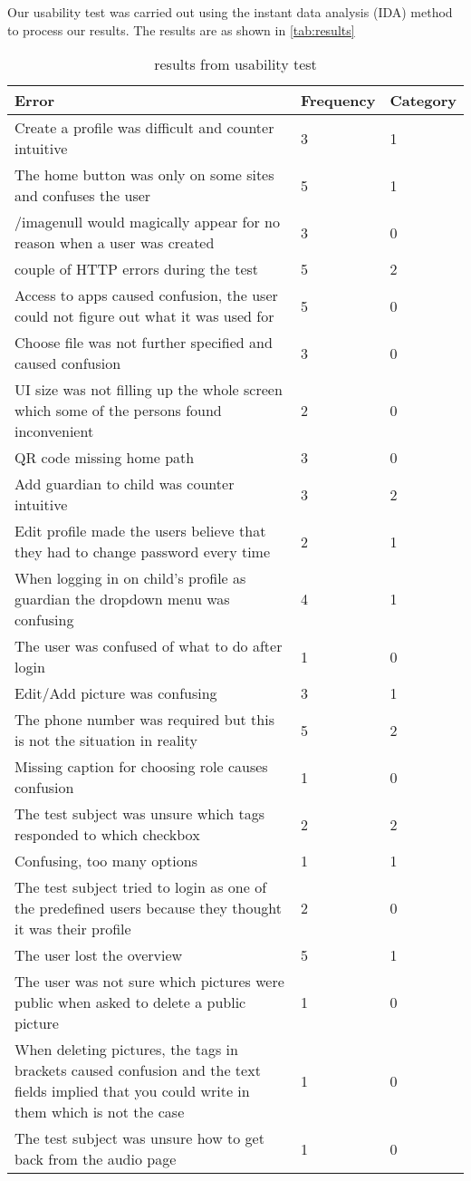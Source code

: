 Our usability test was carried out using the instant data analysis (IDA) method to process our results. The results are as shown in \autoref{tab:results}

\begin{table}
	\centering
	\begin{tabular}{|p{7cm}|l|l|}
		\hline
		Error & Frequency & Category \\
		\hline
		\hline
		Create a profile was difficult and counter intuitive & 3 & 1 \\ \hline
		The home button was only on some sites and confuses the user & 5 & 1 \\ \hline
		/imagenull would magically appear for no reason when a user was created & 3 & 0 \\ \hline
		couple of HTTP errors during the test & 5 & 2 \\ \hline
		Access to apps caused confusion, the user could not figure out what it was used for & 5 & 0 \\ \hline
		Choose file was not further specified and caused confusion & 3 & 0 \\ \hline
		UI size was not filling up the whole screen which some of the persons found inconvenient & 2 & 0 \\ \hline
		QR code missing home path & 3 & 0 \\ \hline
		Add guardian to child was counter intuitive & 3 & 2 \\ \hline
		Edit profile made the users believe that they had to change password every time & 2 & 1 \\ \hline
		When logging in on child's profile as guardian the dropdown menu was confusing & 4 & 1 \\ \hline
		The user was confused of what to do after login & 1 & 0 \\ \hline
		Edit/Add picture was confusing & 3 & 1 \\ \hline
		The phone number was required but this is not the situation in reality & 5 & 2 \\ \hline
		Missing caption for choosing role causes confusion & 1 & 0 \\ \hline
		The test subject was unsure which tags responded to which checkbox & 2 & 2 \\ \hline
		Confusing, too many options & 1 & 1 \\ \hline
		The test subject tried to login as one of the predefined users because they thought it was their profile & 2 & 0 \\ \hline
		The user lost the overview & 5 & 1 \\ \hline
		The user was not sure which pictures were public when asked to delete a public picture & 1 & 0 \\ \hline
		When deleting pictures, the tags in brackets caused confusion and the text fields implied that you could write in them which is not the case & 1 & 0 \\ \hline
		The test subject was unsure how to get back from the audio page & 1 & 0 \\
		\hline
	\end{tabular}
	\caption{results from usability test}
	\label{tab:results}
\end{table}

